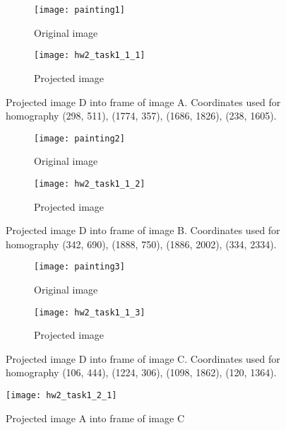 \documentclass[11pt]{article}
\begin{document}
\begin{figure}[H]
\begin{subfigure}{.5\textwidth}
  \centering
  \texttt{[image: painting1]}
  \caption{Original image}
  \label{}
\end{subfigure}
\begin{subfigure}{.5\textwidth}
  \centering
  \texttt{[image: hw2\_task1\_1\_1]}
  \caption{Projected image}
  \label{}
\end{subfigure}
\caption{Projected image D into frame of image A. Coordinates used for homography (298, 511), (1774, 357), (1686, 1826), (238, 1605).}
\end{figure}

\begin{figure}[H]
\begin{subfigure}{.5\textwidth}
  \centering
  \texttt{[image: painting2]}
  \caption{Original image}
  \label{}
\end{subfigure}
\begin{subfigure}{.5\textwidth}
  \centering
  \texttt{[image: hw2\_task1\_1\_2]}
  \caption{Projected image}
  \label{}
\end{subfigure}
\caption{Projected image D into frame of image B. Coordinates used for homography (342, 690), (1888, 750), (1886, 2002), (334, 2334).}
\end{figure}

\begin{figure}[H]
\begin{subfigure}{.5\textwidth}
  \centering
  \texttt{[image: painting3]}
  \caption{Original image}
  \label{}
\end{subfigure}
\begin{subfigure}{.5\textwidth}
  \centering
  \texttt{[image: hw2\_task1\_1\_3]}
  \caption{Projected image}
  \label{}
\end{subfigure}
\caption{Projected image D into frame of image C.  Coordinates used for homography (106, 444), (1224, 306), (1098, 1862), (120, 1364).}
\end{figure}

\begin{figure}[H]
\centering
\texttt{[image: hw2\_task1\_2\_1]}
\caption{Projected image A into frame of image C}
\label{}
\end{figure}

\end{document}
